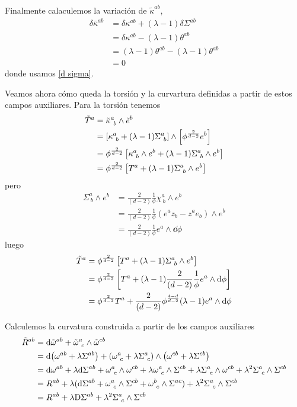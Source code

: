 Finalmente calaculemos la variación de $\tilde{\kappa}^{ab}$,
\begin{align}
  \delta \bar{\kappa}^{ab}&=\delta \kappa^{ab}+(\lambda-1)\delta \Sigma^{ab}\\
  &=\delta \kappa^{ab}-(\lambda-1) \theta^{ab}\\
  &=(\lambda-1) \theta^{ab}-(\lambda-1) \theta^{ab}\\
  &=0
\end{align}
donde usamos \eqref{d sigma}.

Veamos ahora cómo queda la torsión y la curvartura definidas a partir de estos campos auxiliares. Para la torsión tenemos
\begin{align}
  \Tilde{T}^{a}&=\tilde{\kappa}^{a}_{~b}\wedge \tilde{e}^b\\
  &=\left[\kappa^{a}_{~b}+(\lambda-1)\Sigma^{a}_{~b}\right]\wedge \left[\phi^\frac{2}{d-2} e^b\right]\\
  &=\phi^\frac{2}{d-2}\left[\kappa^{a}_{~b}\wedge e^b+(\lambda-1)\Sigma^{a}_{~b}\wedge e^b\right]\\
  &=\phi^\frac{2}{d-2}\left[T^{a}+(\lambda-1)\Sigma^{a}_{~b}\wedge e^b\right]
\end{align}
pero
\begin{align}
  \Sigma^{a}_{~b}\wedge e^b&=\frac{2}{(d-2)}\frac{1}{\phi}\chi^{a}_{~b}\wedge e^b\\
  &=\frac{2}{(d-2)}\frac{1}{\phi}\left(e^{a}z_{b}-z^{a}e_b\right)\wedge e^b\\
  &=\frac{2}{(d-2)}\frac{1}{\phi}e^{a}\wedge \dd \phi
\end{align}
luego
\begin{align}
   \Tilde{T}^{a}&=\phi^\frac{2}{d-2}\left[T^{a}+(\lambda-1)\Sigma^{a}_{~b}\wedge e^b\right]\\
   &=\phi^\frac{2}{d-2}\left[T^{a}+(\lambda-1)\frac{2}{(d-2)}\frac{1}{\phi}e^{a}\wedge \dd \phi\right]\\
   &=\phi^\frac{2}{d-2}T^{a}+\frac{2}{(d-2)}\phi^\frac{4-d}{d-2} (\lambda-1)e^{a}\wedge\dd\phi
\end{align}

Calculemos la curvatura construida a partir de los campos auxiliares
\begin{align}
  \Tilde{R}^{ab}&=\dd\tilde{\omega}^{ab}+\tilde{\omega}^{a}_{~c}\wedge\tilde{\omega}^{cb}\\
  &=\dd (\omega^{ab}+\lambda \Sigma^{ab})+\left(\omega^{a}_{~c}+\lambda\Sigma^{a}_{~c}\right)\wedge \left(\omega^{cb}+\lambda\Sigma^{cb}\right)\\
  &=\dd\omega^{ab}+\lambda \dd\Sigma^{ab} +\omega^{a}_{~c}\wedge \omega^{cb}+\lambda\omega^{a}_{~c}\wedge\Sigma^{cb}+\lambda \Sigma^{a}_{~c}\wedge\omega^{cb}+\lambda^2\Sigma^{a}_{~c}\wedge\Sigma^{cb}\\
  &=R^{ab}+\lambda (\dd\Sigma^{ab}+\omega^{a}_{~c}\wedge \Sigma^{cb}+\omega^b_{~c}\wedge\Sigma^{ac})+\lambda^2\Sigma^{a}_{~c}\wedge\Sigma^{cb}\\
  &=R^{ab}+\lambda \mathrm{D} \Sigma^{ab}+\lambda^2\Sigma^{a}_{~c}\wedge\Sigma^{cb}
\end{align}

